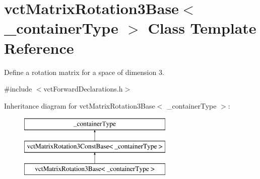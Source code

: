 \hypertarget{classvct_matrix_rotation3_base}{}\section{vct\+Matrix\+Rotation3\+Base$<$ \+\_\+container\+Type $>$ Class Template Reference}
\label{classvct_matrix_rotation3_base}


Define a rotation matrix for a space of dimension 3.  




{\ttfamily \#include $<$vct\+Forward\+Declarations.\+h$>$}

Inheritance diagram for vct\+Matrix\+Rotation3\+Base$<$ \+\_\+container\+Type $>$\+:\begin{figure}[H]
\begin{center}
\leavevmode
\includegraphics[height=3.000000cm]{d1/d91/classvct_matrix_rotation3_base}
\end{center}
\end{figure}
